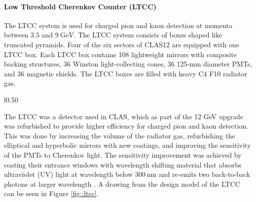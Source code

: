 \paragraph{Low Threshold Cherenkov Counter (LTCC)}
    The LTCC system is used for charged pion and kaon detection at momenta between $3.5$ and $9 ~\text{GeV}$.
    The LTCC system consists of boxes shaped like truncated pyramids.
    Four of the six sectors of CLAS12 are equipped with one LTCC box.
    Each LTCC box contains 108 lightweight mirrors with composite backing structures, 36 Winston light-collecting cones, 36 125-mm diameter PMTs, and 36 magnetic shields.
    The LTCC boxes are filled with heavy C4 F10 radiator gas.

    \begin{wrapfigure}{l}{0.50\textwidth}
        \centering{}
        \caption[LTCC Mirror System]{Layout and components of the optical mirror system within each LTCC box from the design model.}
        \label{fig::ltcc}
    \end{wrapfigure}

    The LTCC was a detector used in CLAS, which as part of the 12 GeV upgrade was refurbished to provide higher efficiency for charged pion and kaon detection.
    This was done by increasing the volume of the radiator gas, refurbishing the elliptical and hyperbolic mirrors with new coatings, and improving the sensitivity of the PMTs to Cherenkov light.
    The sensitivity improvement was achieved by coating their entrance windows with wavelength shifting material that absorbs ultraviolet (UV) light at wavelength below $300 ~\text{nm}$ and re-emits two back-to-back photons at larger wavelength \cite{ungaro2020}.
    A drawing from the design model of the LTCC can be seen in Figure \ref{fig::ltcc}.
